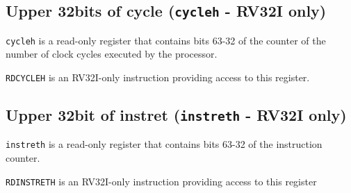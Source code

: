 \subsection{Upper 32bits of cycle (\texttt{cycleh} - RV32I
only)}\label{upper-32bits-of-cycle-cycleh---rv32i-only}

\texttt{cycleh} is a read-only register that contains bits 63-32 of the counter
of the number of clock cycles executed by the processor.

\texttt{RDCYCLEH} is an RV32I-only instruction providing access to this register.

\subsection{Upper 32bit of instret (\texttt{instreth} - RV32I
only)}\label{upper-32bit-of-instret-instreth---rv32i-only}

\texttt{instreth} is a read-only register that contains bits 63-32 of the
instruction counter.

\texttt{RDINSTRETH} is an RV32I-only instruction providing access to this
register
